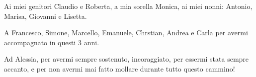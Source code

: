 \begin{flushright}
Ai miei genitori Claudio e Roberta, a mia sorella Monica, ai miei nonni: Antonio, Marisa, Giovanni e Lisetta.

\bigskip

A Francesco, Simone, Marcello, Emanuele, Chrstian, Andrea  e Carla per avermi accompagnato in questi 3 anni.


\bigskip

Ad Alessia, per avermi sempre sostenuto, incoraggiato, per essermi stata sempre accanto, e per non avermi mai fatto mollare durante tutto questo cammino! 

\end{flushright}